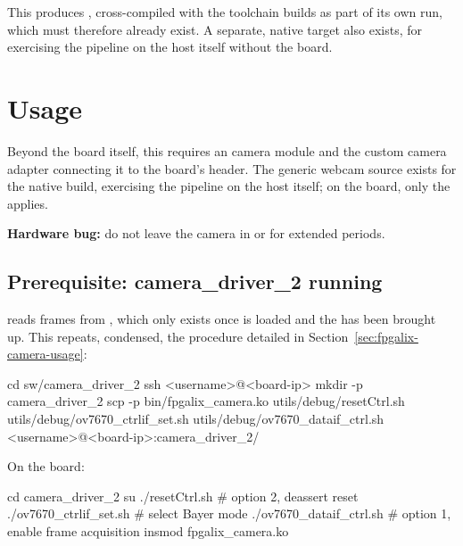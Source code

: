 This produces , cross-compiled with the toolchain  builds as part of its own run, which must therefore already exist. A separate, native  target also exists, for exercising the pipeline on the host itself without the board.

\section{Usage}
\label{sec:fpgalix-vision-usage}

Beyond the  board itself, this requires an  camera module and the custom camera adapter connecting it to the board's  header. The generic webcam source exists for the native  build, exercising the pipeline on the host itself; on the board, only the  applies.

\begin{warningbox}
\textbf{Hardware bug:} do not leave the camera in  or  for extended periods.\footnotemark
\end{warningbox}

\subsection{Prerequisite: camera\_driver\_2 running}
\label{subsec:fpgalix-vision-prereq}

 reads frames from , which only exists once  is loaded and the  has been brought up. This repeats, condensed, the procedure detailed in Section~\ref{sec:fpgalix-camera-usage}:

\begin{shellcodehost}
cd sw/camera_driver_2
ssh <username>@<board-ip> mkdir -p camera_driver_2
scp -p bin/fpgalix_camera.ko utils/debug/resetCtrl.sh utils/debug/ov7670_ctrlif_set.sh utils/debug/ov7670_dataif_ctrl.sh <username>@<board-ip>:camera_driver_2/
\end{shellcodehost}

On the board:

\begin{shellcodeboard}
cd camera_driver_2
su
./resetCtrl.sh
# option 2, deassert reset
./ov7670_ctrlif_set.sh # select Bayer mode
./ov7670_dataif_ctrl.sh # option 1, enable frame acquisition
insmod fpgalix_camera.ko
\end{shellcodeboard}

